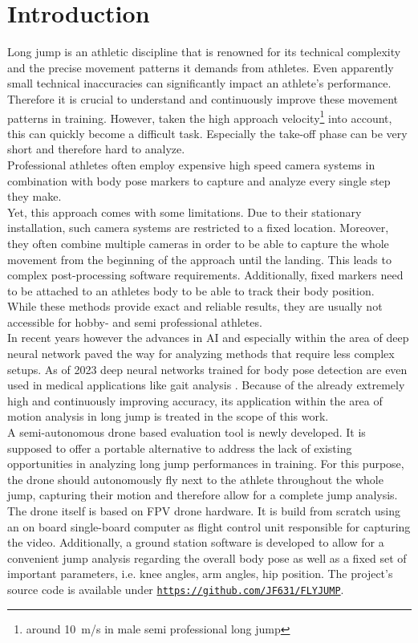 \chapter{Introduction}
Long jump is an athletic discipline that is renowned for its technical
complexity and the precise movement patterns it demands from athletes.
Even apparently small technical inaccuracies can significantly impact an
athlete's performance.
Therefore it is crucial to understand and continuously improve these movement 
patterns in training.
However, taken the high approach velocity\footnote{around 10~m/s in male semi 
professional long jump} into account, this can quickly become a difficult 
task.
Especially the take-off phase can be very short and therefore hard to analyze.\\

\noindent Professional athletes often employ expensive high speed camera 
systems in combination with body pose markers to capture and analyze every 
single step they make.\\
Yet, this approach comes with some limitations.
Due to their stationary installation, such camera systems are restricted to a
fixed location.
Moreover, they often combine multiple cameras in order to be able to capture 
the whole movement from the beginning of the approach until the 
landing.
This leads to complex post-processing software requirements.
Additionally, fixed markers need to be attached to an athletes body to be able 
to track their body position.\\

\noindent While these methods provide exact and reliable results, they are 
usually not accessible for hobby- and semi professional athletes.\\
In recent years however the advances in \ac{AI} and especially within the area 
of deep neural network paved the way for analyzing methods that require less 
complex setups.
As of 2023 deep neural networks trained for body pose detection are even used 
in medical applications like gait analysis \cite{mp_gait_analysis}.
Because of the already extremely high and continuously improving accuracy, 
its application within the area of motion analysis in long jump is treated in 
the scope of this work.\\
A semi-autonomous drone based evaluation tool is newly developed.
It is supposed to offer a portable alternative to address the lack of existing
opportunities in analyzing long jump performances in training.
For this purpose, the drone should autonomously fly next to the athlete 
throughout the whole jump, capturing their motion and therefore allow for a 
complete jump analysis.
The drone itself is based on \ac{FPV} drone hardware.
It is build from scratch using an on board single-board computer as flight 
control unit responsible for capturing the video.
Additionally, a ground station software is developed to allow for a convenient
jump analysis regarding the overall body pose as well as a fixed set of 
important parameters, i.e. knee angles, arm angles, hip position. 
The project's source code is available under \texttt{\url{https://github.com/JF631/FLYJUMP}}.

